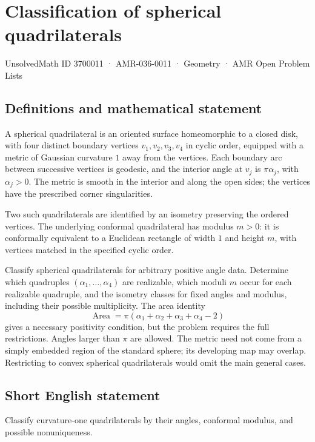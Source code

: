 \documentclass[11pt,a4paper]{article}
\begin{document}
\section*{Classification of spherical quadrilaterals}\label{3700011}
{\small UnsolvedMath ID 3700011 · AMR-036-0011 · Geometry · AMR Open Problem Lists}
\subsection{Definitions and mathematical statement}
A spherical quadrilateral is an oriented surface homeomorphic
to a closed disk, with four distinct boundary vertices
$v_1,v_2,v_3,v_4$ in cyclic order, equipped with a metric of
Gaussian curvature $1$ away from the vertices. Each boundary
arc between successive vertices is geodesic, and the interior
angle at $v_j$ is $\pi\alpha_j$, with $\alpha_j>0$.
The metric is smooth in the interior and along the open sides;
the vertices have the prescribed corner singularities.

Two such quadrilaterals are identified by an isometry preserving
the ordered vertices. The underlying conformal quadrilateral
has modulus $m>0$: it is conformally equivalent to a
Euclidean rectangle of width $1$ and height $m$, with
vertices matched in the specified cyclic order.

Classify spherical quadrilaterals for arbitrary positive angle
data. Determine which quadruples $(\alpha_1,\ldots,\alpha_4)$
are realizable, which moduli $m$ occur for each realizable
quadruple, and the isometry classes for fixed angles and
modulus, including their possible multiplicity.
The area identity
\[
           \operatorname{Area}=\pi
                         (\alpha_1+\alpha_2+\alpha_3+\alpha_4-2)
\]
gives a necessary positivity condition, but the problem
requires the full restrictions.
Angles larger than $\pi$ are allowed. The metric need not
come from a simply embedded region of the standard sphere;
its developing map may overlap. Restricting to convex
spherical quadrilaterals would omit the main general cases.
\subsection{Short English statement}
Classify curvature-one quadrilaterals by their angles, conformal modulus, and possible nonuniqueness.
\end{document}
